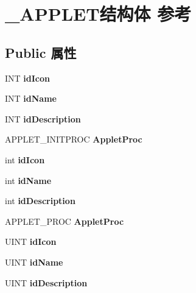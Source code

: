\hypertarget{struct___a_p_p_l_e_t}{}\section{\+\_\+\+A\+P\+P\+L\+E\+T结构体 参考}
\label{struct___a_p_p_l_e_t}
\subsection*{Public 属性}
\begin{DoxyCompactItemize}
\item 
\mbox{\label{struct___a_p_p_l_e_t_a499cd31300fc0dcdac96fd0e390f4a9e}} 
I\+NT {\bfseries id\+Icon}
\item 
\mbox{\label{struct___a_p_p_l_e_t_aa4bf796b158e26859dfa685a7b2e325c}} 
I\+NT {\bfseries id\+Name}
\item 
\mbox{\label{struct___a_p_p_l_e_t_a03c372e29160b03d7eaf155347140085}} 
I\+NT {\bfseries id\+Description}
\item 
\mbox{\label{struct___a_p_p_l_e_t_a66840c04d949df5f2009dc6e6cf9bed8}} 
A\+P\+P\+L\+E\+T\+\_\+\+I\+N\+I\+T\+P\+R\+OC {\bfseries Applet\+Proc}
\item 
\mbox{\label{struct___a_p_p_l_e_t_a499cd31300fc0dcdac96fd0e390f4a9e}} 
int {\bfseries id\+Icon}
\item 
\mbox{\label{struct___a_p_p_l_e_t_aa4bf796b158e26859dfa685a7b2e325c}} 
int {\bfseries id\+Name}
\item 
\mbox{\label{struct___a_p_p_l_e_t_a03c372e29160b03d7eaf155347140085}} 
int {\bfseries id\+Description}
\item 
\mbox{\label{struct___a_p_p_l_e_t_a66840c04d949df5f2009dc6e6cf9bed8}} 
A\+P\+P\+L\+E\+T\+\_\+\+P\+R\+OC {\bfseries Applet\+Proc}
\item 
\mbox{\label{struct___a_p_p_l_e_t_a9a3b28c629a6272ba3190146c18a08f7}} 
U\+I\+NT {\bfseries id\+Icon}
\item 
\mbox{\label{struct___a_p_p_l_e_t_aebfd44d6ea36695e187cafad00133c16}} 
U\+I\+NT {\bfseries id\+Name}
\item 
\mbox{\label{struct___a_p_p_l_e_t_aa15e53e8926634b8000ad50dda69b69c}} 
U\+I\+NT {\bfseries id\+Description}
\end{DoxyCompactItemize}


